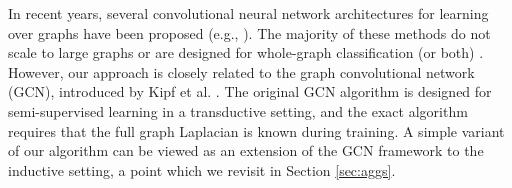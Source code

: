 In recent years, several convolutional neural network architectures for learning over graphs have been proposed (e.g., \cite{bruna2013spectral,duvenaud2015convolutional,
defferrard2016convolutional,kipf2016semi,niepert2016learning}).
The majority of these methods do not scale to large graphs or are designed for whole-graph classification (or both) \cite{bruna2013spectral,duvenaud2015convolutional,
defferrard2016convolutional,niepert2016learning}.
However, our approach is closely related to the graph convolutional network (GCN), introduced by Kipf et al. \cite{kipf2016semi,kipf2016variational}. 
The original GCN algorithm \cite{kipf2016semi} is designed for semi-supervised learning in a transductive setting, and the exact algorithm requires that the full graph Laplacian is known during training. 
A simple variant of our algorithm can be viewed as an extension of the GCN framework to the inductive setting, a point which we revisit in Section \ref{sec:aggs}. 

